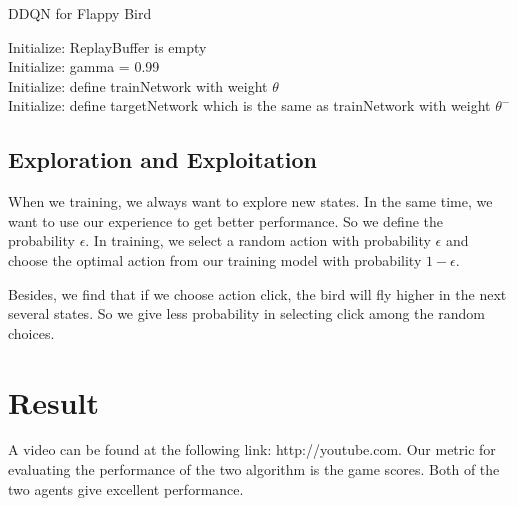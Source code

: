\documentclass[conference,compsoc]{IEEEtran}
\begin{document}
\begin{algorithm}
\caption{DDQN for Flappy Bird}
\label{alg:A1}
Initialize: ReplayBuffer is empty\\
Initialize: gamma = 0.99\\
Initialize: define trainNetwork with weight ${\theta}$\\
Initialize: define targetNetwork which is the same as trainNetwork with weight ${\theta^-}$\\
\end{algorithm}
 
\subsection{Exploration and Exploitation}
When we training, we always want to explore new states. In the same time, we want to use our experience to get better performance. So we define the probability ${\epsilon}$. In training, we select a random action with probability ${\epsilon}$ and choose the optimal action from our training model with probability ${1-\epsilon}$. 
\

\indent Besides, we find that if we choose action click, the bird will fly higher in the next several states. So we give less probability in selecting click among the random choices. 


\section{Result}
\indent A video can be found at the following link: http://youtube.com. Our metric for evaluating the performance of the two algorithm is the game scores. Both of the two agents give excellent performance.
\end{document}
